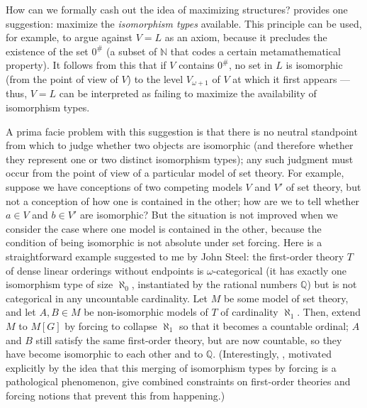\documentclass[letterpaper,12pt]{article}
\newcommand{\N}{\mathbb{N}}
\newcommand{\Q}{\mathbb{Q}}
\begin{document}
How can we formally cash out the idea of maximizing structures? \cite{maddyvlmaximize} provides one suggestion: maximize the \emph{isomorphism types} available. This principle can be used, for example, to argue against $V = L$ as an axiom, because it precludes the existence of the set $0^\#$ (a subset of $\N$ that codes a certain metamathematical property). It follows from this that if $V$ contains $0^\#$, no set in $L$ is isomorphic (from the point of view of $V$) to the level $V_{\omega+1}$ of $V$ at which it first appears --- thus, $V=L$ can be interpreted as failing to maximize the availability of isomorphism types.

A prima facie problem with this suggestion is that there is no neutral standpoint from which to judge whether two objects are isomorphic (and therefore whether they represent one or two distinct isomorphism types); any such judgment must occur from the point of view of a particular model of set theory. For example, suppose we have conceptions of two competing models $V$ and $V'$ of set theory, but not a conception of how one is contained in the other; how are we to tell whether $a \in V$ and $b \in V'$ are isomorphic? But the situation is not improved when we consider the case where one model is contained in the other, because the condition of being isomorphic is not absolute under set forcing. Here is a straightforward example suggested to me by John Steel: the first-order theory $T$ of dense linear orderings without endpoints is $\omega$-categorical (it has exactly one isomorphism type of size $\aleph_0$, instantiated by the rational numbers $\Q$) but is not categorical in any uncountable cardinality. Let $M$ be some model of set theory, and let $A, B \in M$ be non-isomorphic models of $T$ of cardinality $\aleph_1$. Then, extend $M$ to $M[G]$ by forcing to collapse $\aleph_1$ so that it becomes a countable ordinal; $A$ and $B$ still satisfy the same first-order theory, but are now countable, so they have become isomorphic to each other and to $\Q$. (Interestingly, \cite{baldwin1993}, motivated explicitly by the idea that this merging of isomorphism types by forcing is a pathological phenomenon, give combined constraints on first-order theories and forcing notions that prevent this from happening.)
\end{document}
